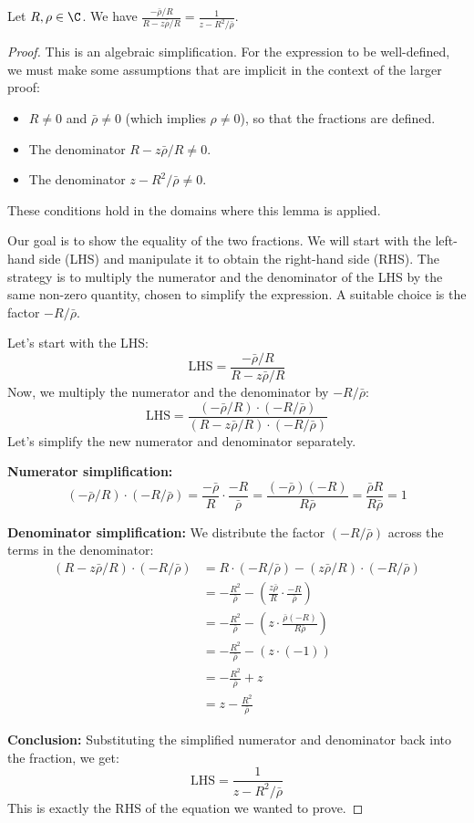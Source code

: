 \begin{lemma}\label{lem:logDeriv_numerator_rearranged} 
\leanok
Let $R, \rho \in \C$. We have $\frac{-\bar\rho/R}{R-z\bar\rho/R} = \frac{1}{z-R^2/\bar\rho}$.
\end{lemma}
\begin{proof}
\leanok
This is an algebraic simplification. For the expression to be well-defined, we must make some assumptions that are implicit in the context of the larger proof:
\begin{itemize}
    \item $R \neq 0$ and $\bar\rho \neq 0$ (which implies $\rho \neq 0$), so that the fractions are defined.
    \item The denominator $R-z\bar\rho/R \neq 0$.
    \item The denominator $z-R^2/\bar\rho \neq 0$.
\end{itemize}
These conditions hold in the domains where this lemma is applied.

Our goal is to show the equality of the two fractions. We will start with the left-hand side (LHS) and manipulate it to obtain the right-hand side (RHS). The strategy is to multiply the numerator and the denominator of the LHS by the same non-zero quantity, chosen to simplify the expression. A suitable choice is the factor $-R/\bar\rho$.

Let's start with the LHS:
\[ \text{LHS} = \frac{-\bar\rho/R}{R-z\bar\rho/R} \]
Now, we multiply the numerator and the denominator by $-R/\bar\rho$:
\[ \text{LHS} = \frac{(-\bar\rho/R) \cdot (-R/\bar\rho)}{(R-z\bar\rho/R) \cdot (-R/\bar\rho)} \]
Let's simplify the new numerator and denominator separately.

\textbf{Numerator simplification:}
\[ (-\bar\rho/R) \cdot (-R/\bar\rho) = \frac{-\bar\rho}{R} \cdot \frac{-R}{\bar\rho} = \frac{(-\bar\rho)(-R)}{R\bar\rho} = \frac{\bar\rho R}{R\bar\rho} = 1 \]

\textbf{Denominator simplification:}
We distribute the factor $(-R/\bar\rho)$ across the terms in the denominator:
\begin{align*} (R-z\bar\rho/R) \cdot (-R/\bar\rho) &= R \cdot (-R/\bar\rho) - (z\bar\rho/R) \cdot (-R/\bar\rho) \\ &= -\frac{R^2}{\bar\rho} - \left( \frac{z\bar\rho}{R} \cdot \frac{-R}{\bar\rho} \right) \\ &= -\frac{R^2}{\bar\rho} - \left( z \cdot \frac{\bar\rho(-R)}{R\bar\rho} \right) \\ &= -\frac{R^2}{\bar\rho} - (z \cdot (-1)) \\ &= -\frac{R^2}{\bar\rho} + z \\ &= z - \frac{R^2}{\bar\rho} \end{align*}

\textbf{Conclusion:}
Substituting the simplified numerator and denominator back into the fraction, we get:
\[ \text{LHS} = \frac{1}{z - R^2/\bar\rho} \]
This is exactly the RHS of the equation we wanted to prove.
\end{proof}

